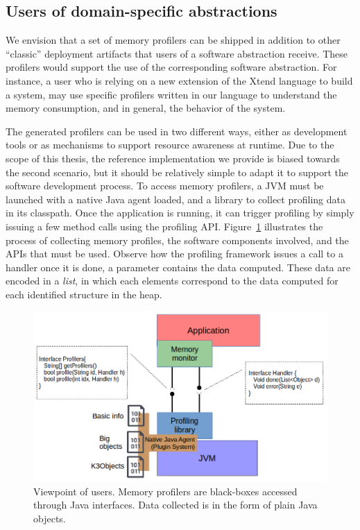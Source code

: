\subsection{Users of domain-specific abstractions} \label{sec:dsl-tooling-users}

We envision that a set of memory profilers can be shipped in addition to other ``classic'' deployment artifacts that users of a software abstraction receive. 
These profilers would support the use of the corresponding software abstraction.
For instance, a user who is relying on a new extension of the Xtend language to build a system, may use specific profilers written in our language to understand the memory consumption, and in general, the behavior of the system.

The generated profilers can be used in two different ways, either as development tools or as mechanisms to support resource awareness at runtime.
Due to the scope of this thesis, the reference implementation we provide is biased towards the second scenario, but it should be relatively simple to adapt it to support the software development process.
To access memory profilers, a JVM must be launched with a native Java agent loaded, and a library to collect profiling data in its classpath.
Once the application is running, it can trigger profiling by simply issuing a few method calls using the profiling API.
Figure~\ref{fig:user-profiling-library-view} illustrates the process of collecting memory profiles, the software components involved, and the APIs that must be used.
Observe how the profiling framework issues a call to a handler once it is done, a parameter contains the data computed.
These data are encoded in a \textit{list}, in which each elements correspond to the data computed for each identified structure in the heap.

\begin{figure}[!t]
\centering
\includegraphics[scale=0.5]{./chapter6/fig/user-profiler-view.png}
\caption{Viewpoint of users. Memory profilers are black-boxes accessed through Java interfaces. Data collected is in the form of plain Java objects.}\label{fig:user-profiling-library-view}
\end{figure}

